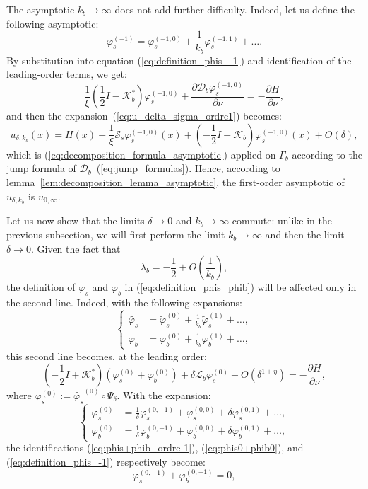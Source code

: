 \documentclass[final]{siamltex}
\numberwithin{equation}{section}
\numberwithin{figure}{section}
\numberwithin{table}{section}
\begin{document}
The asymptotic $k_{b}\rightarrow\infty$ does not add further
difficulty. Indeed, let us define the following asymptotic:
\[
\varphi_{s}^{(-1)}=\varphi_{s}^{(-1,0)}+\frac{1}{k_{b}}\varphi_{s}^{(-1,1)}+\ldots.
\]
 By substitution into equation (\ref{eq:definition_phis_-1}) and
identification of the leading-order terms, we get:
\[
\frac{1}{\xi}\left(\frac{1}{2}I-\mathcal{K}_{b}^{*}\right)\varphi_{s}^{(-1,0)}+\frac{\partial\mathcal{D}_{b}\varphi_{s}^{(-1,0)}}{\partial\nu}=-\frac{\partial H}{\partial\nu},
\]
 and then the expansion~(\ref{eq:u_delta_sigma_ordre1}) becomes:
\begin{equation}
u_{\delta,k_{b}}(x)=H(x)-\frac{1}{\xi}\mathcal{S}_{s}\varphi_{s}^{(-1,0)}(x)+\left(-\frac{1}{2}I+\mathcal{K}_{b}\right)\varphi_{s}^{(-1,0)}(x)+O\left(\delta\right),\label{eq:DL_u_final}
\end{equation}
 which is (\ref{eq:decomposition_formula_asymptotic}) applied on
$\Gamma_{b}$ according to the jump formula of
$\mathcal{D}_{b}$~(\ref{eq:jump_formulas}). Hence, according to
lemma~\ref{lem:decomposition_lemma_asymptotic}, the first-order
asymptotic of $u_{\delta,k_{b}}$ is $u_{0,\infty}$.

Let us now show that the limits $\delta\rightarrow0$ and
$k_{b}\rightarrow\infty$ commute: unlike in the previous
subsection, we will first perform the limit
$k_{b}\rightarrow\infty$ and then the limit $\delta\rightarrow0$.
Given the fact that
\[
\lambda_{b}=-\frac{1}{2}+O\left(\frac{1}{k_{b}}\right),
\]
 the definition of $\tilde{\varphi_{s}}$ and $\varphi_{b}$ in (\ref{eq:definition_phis_phib})
will be affected only in the second line. Indeed, with the following
expansions:
\[
\left\{ \begin{alignedat}{1}\tilde{\varphi_{s}} & =\tilde{\varphi}_{s}^{(0)}+\frac{1}{k_{b}}\tilde{\varphi}_{s}^{(1)}+\ldots,\\
\varphi_{b} & =\varphi_{b}^{(0)}+\frac{1}{k_{b}}\varphi_{b}^{(1)}+\ldots,
\end{alignedat}
\right.
\]
 this second line becomes, at the leading order:
\[
\left(-\frac{1}{2}I+\mathcal{K}_{b}^{*}\right)(\varphi_{s}^{(0)}+\varphi_{b}^{(0)})+\delta\mathcal{L}_{b}\varphi_{s}^{(0)}+O(\delta^{1+\eta})=-\frac{\partial H}{\partial\nu},
\]
 where $\varphi_{s}^{(0)}:=\tilde{\varphi_{s}}^{(0)}\circ\Psi_{\delta}$.
With the expansion:
\[
\left\{ \begin{alignedat}{1}\varphi_{s}^{(0)} & =\frac{1}{\delta}\varphi_{s}^{(0,-1)}+\varphi_{s}^{(0,0)}+\delta\varphi_{s}^{(0,1)}+\ldots,\\
\varphi_{b}^{(0)} & =\frac{1}{\delta}\varphi_{b}^{(0,-1)}+\varphi_{b}^{(0,0)}+\delta\varphi_{b}^{(0,1)}+\ldots,
\end{alignedat}
\right.
\]
 the identifications (\ref{eq:phis+phib_ordre-1}), (\ref{eq:phis0+phib0}),
and (\ref{eq:definition_phis_-1}) respectively become:
\begin{equation}
\varphi_{s}^{(0,-1)}+\varphi_{b}^{(0,-1)}=0,\label{eq:phis+phib_ordre-1(bis)}
\end{equation}
\end{document}
